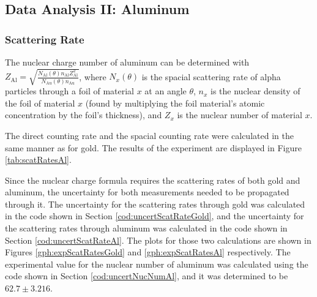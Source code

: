 \documentclass[a4paper]{article}
\begin{document}
\subsection{Data Analysis II: Aluminum}

\subsubsection{Scattering Rate}

\qq The nuclear charge number of aluminum can be determined with \\
\( Z_{\text{Al}} = \sqrt{\frac{N_{\text{Al}} (\theta) n_{\text{Al}}
    Z^2_{\text{Al}}}{N_{\text{Au}} (\theta) n_{\text{Au}}}} \), where
\( N_x (\theta) \) is the spacial scattering rate of alpha particles through a
foil of material \( x \) at an angle \( \theta \), \( n_x \) is the nuclear
density of the foil of material \( x \) (found by multiplying the foil
material's atomic concentration by the foil's thickness), and \( Z_x \) is the
nuclear number of material \( x \).

\qq The direct counting rate and the spacial counting rate were calculated in
the same manner as for gold. The results of the experiment are displayed in
Figure \ref{tab:scatRatesAl}.

\qq 

\qq Since the nuclear charge formula requires the scattering rates of both gold
and aluminum, the uncertainty for both measurements needed to be propagated
through it. The uncertainty for the scattering rates through gold was calculated
in the code shown in Section \ref{cod:uncertScatRateGold}, and the uncertainty
for the scattering rates through aluminum was calculated in the code shown in
Section \ref{cod:uncertScatRateAl}. The plots for those two calculations are
shown in Figures \ref{gph:expScatRatesGold} and \ref{gph:expScatRatesAl}
respectively. The experimental value for the nuclear number of aluminum was
calculated using the code shown in Section \ref{cod:uncertNucNumAl}, and it was
determined to be \( 62.7 \pm 3.216 \). 
\end{document}
